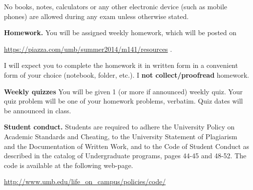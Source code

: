 \documentclass{article}
\begin{document}
No books, notes, calculators or any other electronic device (such as mobile phones) are allowed during any exam unless otherwise stated.

\medskip
\noindent \textbf{Homework.} You will be assigned weekly homework, which will be posted on

\url{https://piazza.com/umb/summer2014/m141/resources} \quad \quad \quad .

\noindent I will expect you to complete the homework it in written form in a convenient form of your choice (notebook, folder, etc.). I \textbf{not collect/proofread} homework. 
 
 \medskip
\noindent \textbf{Weekly quizzes} You will be given 1 (or more if announced) weekly quiz. Your quiz problem will be one of your homework problems, verbatim. Quiz dates will be announced in class. 



\medskip
\noindent \textbf{Student conduct.} Students  are required to adhere the University Policy on Academic Standards and Cheating, to the University Statement of Plagiarism and the Documentation of Written Work, and to the Code of Student Conduct as described in the catalog of Undergraduate programs, pages 44-45 and 48-52. The code is available at the following web-page.

\noindent\url{http://www.umb.edu/life_on_campus/policies/code/}
\end{document}
